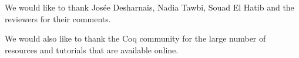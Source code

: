 \documentclass[sigplan,9pt]{acmart}\settopmatter{printfolios=true,printccs=false,printacmref=false}
\begin{document}
\newpage

\begin{acks}
  We would like to thank Josée Desharnais, Nadia Tawbi, Souad El Hatib and the reviewers for their comments.

  We would also like to thank the Coq community for the large number of resources and tutorials that are available online.
\end{acks}


\end{document}
